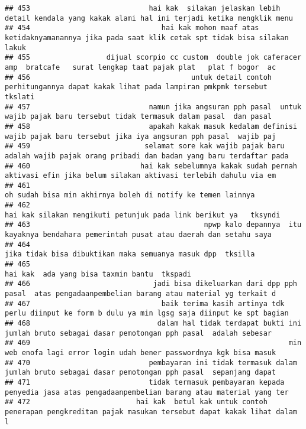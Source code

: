 \documentclass[
]{article}
\begin{document}
\begin{verbatim}
## 453                            hai kak  silakan jelaskan lebih detail kendala yang kakak alami hal ini terjadi ketika mengklik menu 
## 454                               hai kak mohon maaf atas ketidaknyamanannya jika pada saat klik cetak spt tidak bisa silakan lakuk 
## 455                  dijual scorpio cc custom  double jok caferacer amp  bratcafe   surat lengkap taat pajak plat   plat f bogor  ac
## 456                                      untuk detail contoh perhitungannya dapat kakak lihat pada lampiran pmkpmk tersebut  tkslati
## 457                            namun jika angsuran pph pasal  untuk wajib pajak baru tersebut tidak termasuk dalam pasal  dan pasal 
## 458                            apakah kakak masuk kedalam definisi wajib pajak baru tersebut jika iya angsuran pph pasal  wajib paj 
## 459                           selamat sore kak wajib pajak baru adalah wajib pajak orang pribadi dan badan yang baru terdaftar pada 
## 460                          hai kak sebelumnya kakak sudah pernah aktivasi efin jika belum silakan aktivasi terlebih dahulu via em 
## 461                                                                      oh sudah bisa min akhirnya boleh di notify ke temen lainnya
## 462                                                                hai kak silakan mengikuti petunjuk pada link berikut ya   tksyndi
## 463                                         npwp kalo depannya  itu kayaknya bendahara pemerintah pusat atau daerah dan setahu saya 
## 464                                                                      jika tidak bisa dibuktikan maka semuanya masuk dpp  tksilla
## 465                                                                                     hai kak  ada yang bisa taxmin bantu  tkspadi
## 466                             jadi bisa dikeluarkan dari dpp pph pasal  atas pengadaanpembelian barang atau material yg terkait d 
## 467                               baik terima kasih artinya tdk perlu diinput ke form b dulu ya min lgsg saja diinput ke spt bagian 
## 468                              dalam hal tidak terdapat bukti ini jumlah bruto sebagai dasar pemotongan pph pasal  adalah sebesar 
## 469                                                             min web enofa lagi error login udah bener passwordnya kgk bisa masuk
## 470                            pembayaran ini tidak termasuk dalam jumlah bruto sebagai dasar pemotongan pph pasal  sepanjang dapat 
## 471                            tidak termasuk pembayaran kepada penyedia jasa atas pengadaanpembelian barang atau material yang ter 
## 472                         hai kak  betul kak untuk contoh penerapan pengkreditan pajak masukan tersebut dapat kakak lihat dalam l 

\end{verbatim}
\end{document}
